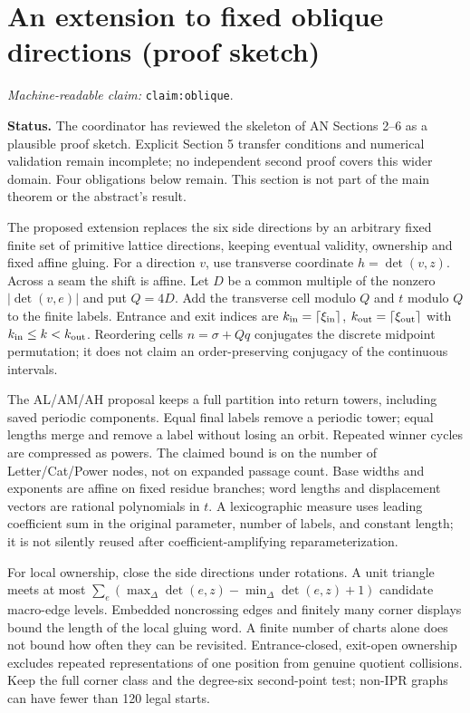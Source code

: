 \documentclass[11pt]{amsart}
\newcommand{\record}[1]{\nolinkurl{#1}}
\newcommand{\claimid}[1]{\par\nopagebreak\noindent\textit{Machine-readable claim:} \record{#1}.\par}
\theoremstyle{definition}\newtheorem{definition}{Definition}
\begin{document}
\section{An extension to fixed oblique directions (proof sketch)}\label{sec:extension}
\label{claim:oblique}\claimid{claim:oblique}
\textbf{Status.} The coordinator has reviewed the skeleton of AN
Sections 2--6 as a plausible proof sketch. Explicit Section 5 transfer
conditions and numerical validation remain incomplete; no independent
second proof covers this wider domain. Four obligations below remain.
This section is not part of the main theorem or the abstract's result.

The proposed extension replaces the six side directions by an arbitrary
fixed finite set of primitive lattice directions, keeping eventual
validity, ownership and fixed affine gluing. For a direction $v$, use
transverse coordinate $h=\det(v,z)$. Across a seam the shift is affine.
Let $D$ be a common multiple of the nonzero $|\det(v,e)|$ and put
$Q=4D$. Add the transverse cell modulo $Q$ and $t$ modulo $Q$ to the
finite labels. Entrance and exit indices are
$k_{\rm in}=\lceil\xi_{\rm in}\rceil$,
$k_{\rm out}=\lceil\xi_{\rm out}\rceil$ with
$k_{\rm in}\le k<k_{\rm out}$. Reordering cells $n=\sigma+Qq$
conjugates the discrete midpoint permutation; it does not claim an
order-preserving conjugacy of the continuous intervals.

The AL/AM/AH proposal keeps a full partition into return towers,
including saved periodic components. Equal final labels remove a
periodic tower; equal lengths merge and remove a label without losing
an orbit. Repeated winner cycles are compressed as powers. The claimed
bound is on the number of Letter/Cat/Power nodes, not on expanded
passage count. Base widths and exponents are affine on fixed residue
branches; word lengths and displacement vectors are rational
polynomials in $t$. A lexicographic measure uses leading coefficient
sum in the original parameter, number of labels, and constant length;
it is not silently reused after coefficient-amplifying reparameterization.

For local ownership, close the side directions under rotations. A
unit triangle meets at most
$\sum_e(\max_\Delta\det(e,z)-\min_\Delta\det(e,z)+1)$
candidate macro-edge levels. Embedded noncrossing edges and finitely
many corner displays bound the length of the local gluing word.
A finite number of charts alone does not bound how often they can
be revisited. Entrance-closed, exit-open ownership excludes repeated
representations of one position from genuine quotient collisions.
Keep the full corner class and the degree-six second-point test;
non-IPR graphs can have fewer than 120 legal starts.
\end{document}
